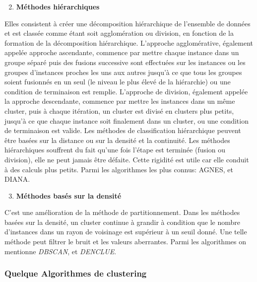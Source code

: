 \begin{enumerate}[nosep,label=\textbf{\arabic*)}]
	\setcounter{enumi}{1}
	\item \textbf{Méthodes hiérarchiques}
\end{enumerate}\mbox{}\indent Elles consistent à créer une décomposition hiérarchique de l'ensemble de données et est classée comme étant soit agglomération ou division, en fonction de la formation de la décomposition hiérarchique. L’approche agglomérative, également appelée approche ascendante, commence par mettre chaque instance dans un groupe séparé puis des fusions successive sont effectuées sur les instances ou les groupes d'instances proches les uns aux autres jusqu'à ce que tous les groupes soient fusionnés en un seul (le niveau le plus élevé de la hiérarchie) ou une condition de terminaison est remplie. L’approche de division, également appelée la approche descendante, commence par mettre les instances dans un même cluster, puis à chaque itération, un cluster est divisé en clusters plus petits, jusqu'à ce que chaque instance soit finalement dans un cluster, ou une condition de terminaison est valide. 
Les méthodes de classification hiérarchique peuvent être basées sur la distance ou sur la densité et la continuité. Les méthodes hiérarchiques souffrent du fait qu’une fois l’étape est terminée (fusion ou division), elle ne peut jamais être défaite. Cette rigidité est utile car elle conduit à des calculs plus petits. Parmi les algorithmes les plus connus: AGNES, et DIANA.\\

\begin{enumerate}[nosep,label=\textbf{\arabic*)}]
	\setcounter{enumi}{2}
	\item \textbf{Méthodes basés sur la densité}
\end{enumerate}\mbox{}\indent C’est une amélioration de la méthode de partitionnement. Dans les méthodes basées sur la  densité, un cluster continue à grandir à condition que le nombre d’instances dans un rayon de voisinage est supérieur à un seuil donné. Une telle méthode peut filtrer le bruit et les valeurs aberrantes. Parmi les algorithmes on mentionne \textit{DBSCAN}, et \textit{DENCLUE}.\\


\subsubsection*{Quelque Algorithmes de clustering }

